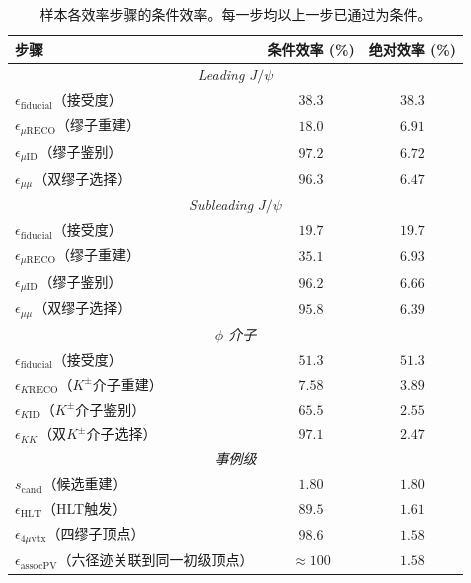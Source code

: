 \begin{table}[htbp]
  \centering
  \caption{\DPSone 样本各效率步骤的条件效率。每一步均以上一步已通过为条件。}
  \label{tab:cutflow-dps1}
  \small
  \begin{tabular}{lcc}
    \toprule
    步骤 & 条件效率 (\%) & 绝对效率 (\%) \\
    \midrule
    \multicolumn{3}{c}{\textit{Leading $J/\psi$}} \\
    $\epsilon_{\mathrm{fiducial}}$（接受度）  & $38.3$ & $38.3$ \\
    $\epsilon_{\mu\mathrm{RECO}}$（缪子重建）       & $18.0$ & $6.91$ \\
    $\epsilon_{\mu\mathrm{ID}}$（缪子鉴别）         & $97.2$ & $6.72$ \\
    $\epsilon_{\mu\mu}$（双缪子选择）               & $96.3$ & $6.47$ \\
    \midrule
    \multicolumn{3}{c}{\textit{Subleading $J/\psi$}} \\
    $\epsilon_{\mathrm{fiducial}}$（接受度）  & $19.7$ & $19.7$ \\
    $\epsilon_{\mu\mathrm{RECO}}$（缪子重建）       & $35.1$ & $6.93$ \\
    $\epsilon_{\mu\mathrm{ID}}$（缪子鉴别）         & $96.2$ & $6.66$ \\
    $\epsilon_{\mu\mu}$（双缪子选择）               & $95.8$ & $6.39$ \\
    \midrule
    \multicolumn{3}{c}{\textit{$\phi$ 介子}} \\
    $\epsilon_{\mathrm{fiducial}}$（接受度）  & $51.3$ & $51.3$ \\
    $\epsilon_{K\mathrm{RECO}}$（$K^\pm$介子重建）         & $7.58$ & $3.89$ \\
    $\epsilon_{K\mathrm{ID}}$（$K^\pm$介子鉴别）           & $65.5$ & $2.55$ \\
    $\epsilon_{KK}$（双$K^\pm$介子选择）                   & $97.1$ & $2.47$ \\
    \midrule
    \multicolumn{3}{c}{\textit{事例级}} \\
    $s_{\mathrm{cand}}$（候选重建）                   & $1.80$ & $1.80$ \\
    $\epsilon_{\mathrm{HLT}}$（HLT触发）               & $89.5$ & $1.61$ \\
    $\epsilon_{4\mu\mathrm{vtx}}$（四缪子顶点）        & $98.6$ & $1.58$ \\
    $\epsilon_{\mathrm{assocPV}}$（六径迹关联到同一初级顶点） & $\approx 100$ & $1.58$ \\
    \bottomrule
  \end{tabular}
\end{table}

